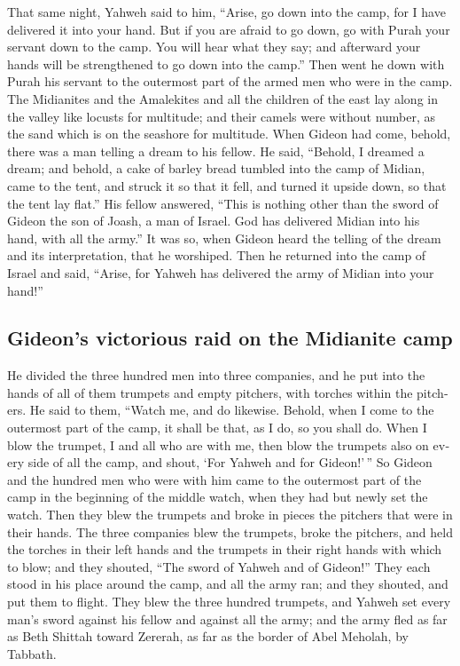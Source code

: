 \begin{paracol}{2}
\begin{otherlanguage}{english}
 That same night, Yahweh said to him, ``Arise, go down
into the camp, for I have delivered it into your hand. 
But if you are afraid to go down, go with Purah your servant down to the
camp.  You will hear what they say; and afterward your
hands will be strengthened to go down into the camp.'' Then went he down
with Purah his servant to the outermost part of the armed men who were
in the camp.  The Midianites and the Amalekites and all
the children of the east lay along in the valley like locusts for
multitude; and their camels were without number, as the sand which is on
the seashore for multitude.  When Gideon had come,
behold, there was a man telling a dream to his fellow. He said,
``Behold, I dreamed a dream; and behold, a cake of barley bread tumbled
into the camp of Midian, came to the tent, and struck it so that it
fell, and turned it upside down, so that the tent lay flat.''
 His fellow answered, ``This is nothing other than the
sword of Gideon the son of Joash, a man of Israel. God has delivered
Midian into his hand, with all the army.''  It was so,
when Gideon heard the telling of the dream and its interpretation, that
he worshiped. Then he returned into the camp of Israel and said,
``Arise, for Yahweh has delivered the army of Midian into your hand!''

\hypertarget{gideons-victorious-raid-on-the-midianite-camp}{%
\subsection{Gideon's victorious raid on the Midianite
camp}\label{gideons-victorious-raid-on-the-midianite-camp}}

 He divided the three hundred men into three companies,
and he put into the hands of all of them trumpets and empty pitchers,
with torches within the pitchers.  He said to them,
``Watch me, and do likewise. Behold, when I come to the outermost part
of the camp, it shall be that, as I do, so you shall do. 
When I blow the trumpet, I and all who are with me, then blow the
trumpets also on every side of all the camp, and shout, `For Yahweh and
for Gideon!'\,''  So Gideon and the hundred men who were
with him came to the outermost part of the camp in the beginning of the
middle watch, when they had but newly set the watch. Then they blew the
trumpets and broke in pieces the pitchers that were in their hands.
 The three companies blew the trumpets, broke the
pitchers, and held the torches in their left hands and the trumpets in
their right hands with which to blow; and they shouted, ``The sword of
Yahweh and of Gideon!''  They each stood in his place
around the camp, and all the army ran; and they shouted, and put them to
flight.  They blew the three hundred trumpets, and Yahweh
set every man's sword against his fellow and against all the army; and
the army fled as far as Beth Shittah toward Zererah, as far as the
border of Abel Meholah, by Tabbath.


\end{otherlanguage}
\end{paracol}
